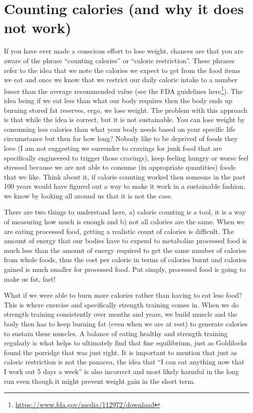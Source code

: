 \documentclass[
  oneside]{book}
\DeclareRobustCommand{\href}[2]{#2\footnote{\url{#1}}}
\begin{document}
\hypertarget{counting-calories-and-why-it-does-not-work}{%
\section{Counting calories (and why it does not work)}\label{counting-calories-and-why-it-does-not-work}}

If you have ever made a conscious effort to lose weight, chances are that you are aware of the phrase ``counting calories'' or ``caloric restriction''. These phrases refer to the idea that we note the calories we expect to get from the food items we eat and once we know that we restrict our daily caloric intake to a number lesser than the average recommended value (see the FDA guidelines \href{https://www.fda.gov/media/112972/download}{here}). The idea being if we eat less than what our body requires then the body ends up burning stored fat reserves, ergo, we lose weight. The problem with this approach is that while the idea is correct, but it is not sustainable. You can lose weight by consuming less calories than what your body needs based on your specific life circumstance but then for how long? Nobody like to be deprived of foods they love (I am not suggesting we surrender to cravings for junk food that are specifically engineered to trigger those cravings), keep feeling hungry or worse feel stressed because we are not able to consume (in appropriate quantities) foods that we like. Think about it, if calorie counting worked then someone in the past 100 years would have figured out a way to make it work in a sustainable fashion, we know by looking all around us that it is not the case.

There are two things to understand here, a) calorie counting is a tool, it is a way of measuring how much is enough and b) not all calories are the same. When we are eating processed food, getting a realistic count of calories is difficult. The amount of energy that our bodies have to expend to metabolize processed food is much less than the amount of energy required to get the same number of calories from whole foods, thus the cost per calorie in terms of calories burnt and calories gained is much smaller for processed food. Put simply, processed food is going to make us fat, fast!

What if we were able to burn more calories rather than having to eat less food? This is where exercise and specifically strength training comes in. When we do strength training consistently over months and years, we build muscle and the body then has to keep burning fat (even when we are at rest) to generate calories to sustain these muscles. A balance of eating healthy and strength training regularly is what helps to ultimately find that fine equilibrium, just as Goldilocks found the porridge that was just right. It is important to mention that just as caloric restriction is not the panacea, the idea that ``I can eat anything now that I work out 5 days a week'' is also incorrect and most likely harmful in the long run even though it might prevent weight gain in the short term.
\end{document}
